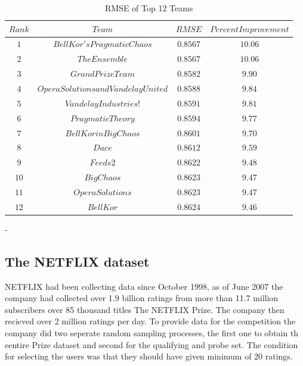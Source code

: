 \begin{table}
\centering 
\begin{tabular}{|c|c|c|c|} \hline %
$Rank$ & $Team$ & 
$RMSE$ &  $Percent Improvement$  \\ 
\hline
$ 1$
& $BellKor's Pragmatic Chaos$
& $0.8567$
& $10.06$ \\ %
$ 2$
& $The Ensemble$
& $0.8567$
& $10.06$ \\ %
$ 3$
& $Grand Prize Team$
& $0.8582$
& $9.90$\\  %
$ 4$
& $Opera Solutions and Vandelay United$
& $0.8588$
& $9.84$\\  %
$ 5$
& $Vandelay Industries !$
& $0.8591$
& $9.81$ \\%
$ 6$
& $PragmaticTheory$
& $0.8594$
& $9.77$ \\ %
$ 7$
& $BellKor in BigChaos$
& $0.8601$
& $9.70$ \\ %
$ 8$
& $Dace$
& $0.8612$
& $9.59$ \\ %
$ 9$
& $Feeds2$
& $0.8622$
& $9.48$  \\%
$ 10$
& $BigChaos$
& $0.8623$
& $9.47$ \\ %
$ 11$
& $Opera Solutions$
& $0.8623$
& $9.47$ \\ %
$ 12$ 
& $BellKor$        
& $0.8624$ 
& $9.46$  \\ \hline 
\end{tabular}
\caption{RMSE of Top 12 Teams}
\label{tab:TopTeams}
\end{table}
-
\subsection{The NETFLIX dataset}
NETFLIX had been collecting data since October 1998,
as of June 2007 the company had collected over 1.9 billion ratings from more
than 11.7 million subscribers over 85 thousand titles \refname{The NETFLIX
Prize}. The company then recieved over 2 million ratings per day. To provide
data for the competition the company did two seperate random sampling processes,
the first one to obtain th eentire Prize dataset and second for the qualifying
and probe set. The condition for selecting the users was that they should have
given minimum of 20 ratings. \\

